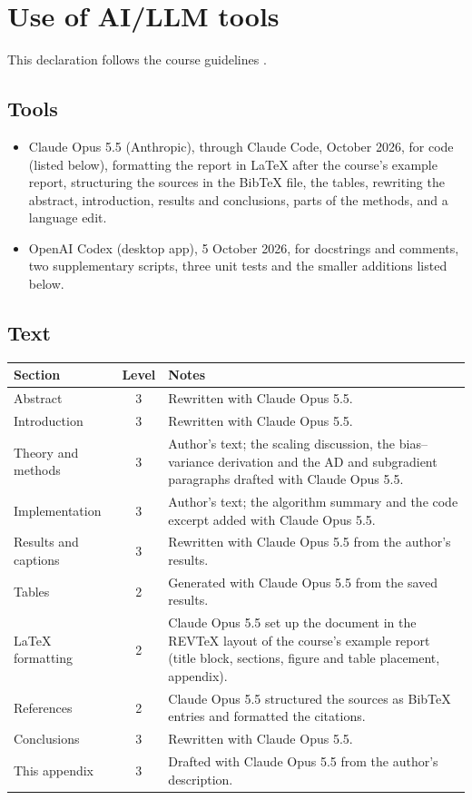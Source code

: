 \documentclass[aps,prb,reprint,superscriptaddress,nofootinbib,longbibliography,floatfix]{revtex4-2}
\begin{document}
\section{Use of AI/LLM tools}\label{app:llm}
This declaration follows the course guidelines \cite{LLMGuidelines2026}.

\subsection{Tools}
\begin{itemize}
\item Claude Opus 5.5 (Anthropic), through Claude Code, October 2026, for code (listed below), formatting the report in LaTeX after the course's example report, structuring the sources in the BibTeX file, the tables, rewriting the abstract, introduction, results and conclusions, parts of the methods, and a language edit.
\item OpenAI Codex (desktop app), 5 October 2026, for docstrings and comments, two supplementary scripts, three unit tests and the smaller additions listed below.
\end{itemize}

\subsection{Text}
{\small
\noindent\begin{tabular}{@{}p{}cp{}@{}}
\hline
Section & Level & Notes\\ \hline
Abstract & 3 & Rewritten with Claude Opus 5.5.\\
Introduction & 3 & Rewritten with Claude Opus 5.5.\\
Theory and methods & 3 & Author's text; the scaling discussion, the bias--variance derivation and the AD and subgradient paragraphs drafted with Claude Opus 5.5.\\
Implementation & 3 & Author's text; the algorithm summary and the code excerpt added with Claude Opus 5.5.\\
Results and captions & 3 & Rewritten with Claude Opus 5.5 from the author's results.\\
Tables & 2 & Generated with Claude Opus 5.5 from the saved results.\\
LaTeX formatting & 2 & Claude Opus 5.5 set up the document in the REVTeX layout of the course's example report (title block, sections, figure and table placement, appendix).\\
References & 2 & Claude Opus 5.5 structured the sources as BibTeX entries and formatted the citations.\\
Conclusions & 3 & Rewritten with Claude Opus 5.5.\\
This appendix & 3 & Drafted with Claude Opus 5.5 from the author's description.\\
\hline
\end{tabular}}
\end{document}

